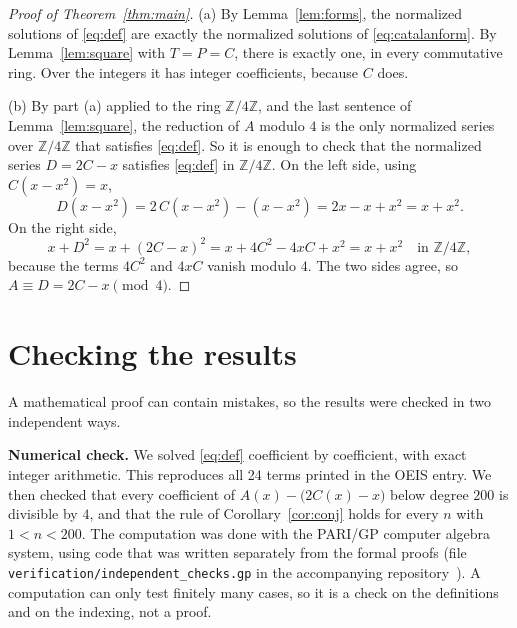 \documentclass[11pt,a4paper]{article}
\theoremstyle{definition}
\theoremstyle{remark}
\newcommand{\Z}{\mathbb{Z}}
\newcommand{\para}[1]{\par\medskip\noindent\textbf{#1}\enspace}
\begin{document}
\begin{proof}[Proof of Theorem~\ref{thm:main}]
(a) By Lemma~\ref{lem:forms}, the normalized solutions of \eqref{eq:def} are exactly the normalized solutions of
\eqref{eq:catalanform}. By Lemma~\ref{lem:square} with $T=P=C$, there is exactly one, in every commutative ring. Over the
integers it has integer coefficients, because $C$ does.

(b) By part (a) applied to the ring $\Z/4\Z$, and the last sentence of Lemma~\ref{lem:square}, the reduction of $A$ modulo
$4$ is the only normalized series over $\Z/4\Z$ that satisfies \eqref{eq:def}. So it is enough to check that the normalized
series $D=2C-x$ satisfies \eqref{eq:def} in $\Z/4\Z$. On the left side, using $C(x-x^2)=x$,
\[
D(x-x^2)=2\,C(x-x^2)-(x-x^2)=2x-x+x^2=x+x^2 .
\]
On the right side,
\[
x+D^2=x+(2C-x)^2=x+4C^2-4xC+x^2=x+x^2\quad\text{in }\Z/4\Z,
\]
because the terms $4C^2$ and $4xC$ vanish modulo $4$. The two sides agree, so $A\equiv D=2C-x\pmod4$.
\end{proof}

\section{Checking the results}\label{sec:checks}

A mathematical proof can contain mistakes, so the results were checked in two independent ways.

\para{Numerical check.}
We solved \eqref{eq:def} coefficient by coefficient, with exact integer arithmetic. This reproduces all 24 terms
printed in the OEIS entry. We then checked that every coefficient of $A(x)-\bigl(2C(x)-x\bigr)$ below degree $200$ is
divisible by $4$, and that the rule of Corollary~\ref{cor:conj} holds for every $n$ with $1<n<200$.
The computation was done with the PARI/GP computer algebra system, using code that was written separately from the
formal proofs (file \texttt{verification/independent\_checks.gp} in the accompanying repository~\cite{repo}).
A computation can only test finitely many cases, so it is a check on the definitions and on the indexing, not a proof.
\end{document}
